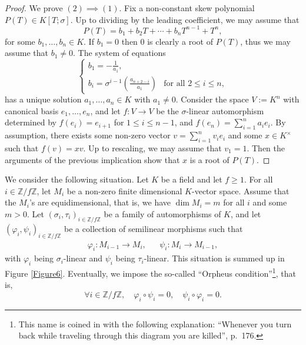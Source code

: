 \documentclass[12pt]{amsart}
\theoremstyle{definition}
\newcommand{\<}{\langle}   %
\renewcommand{\>}{\rangle} %
\begin{document}
\begin{proof}
    We prove $(2) \implies (1)$. Fix a non-constant skew polynomial $P(T) \in K[T;\sigma]$. Up to dividing by the leading coefficient, we may assume that
    \begin{equation*}
        P(T) = b_1 + b_2T + \cdots + b_{n}T^{n-1} + T^n,
    \end{equation*}
    for some $b_1,\ldots ,b_n \in K$. If $b_1 = 0$ then $0$ is clearly a root of $P(T)$, thus we may assume that $b_1 \not = 0$. The system of equations 
    \begin{equation*}
        \begin{cases}
            b_1 = -\frac{1}{a_1}, & \\
            b_i = \sigma^{i-1}\left(\frac{a_{n+2-i}}{a_1}\right) & \text{for all } 2 \leq i \leq n,
        \end{cases}
    \end{equation*}
    has a unique solution $a_1, \ldots , a_n \in K$ with $a_1 \not = 0$. Consider the space $V := K^n$ with canonical basis $e_1,\ldots ,e_n$, and let $f: V \to V$ be the $\sigma$-linear automorphism determined by $f(e_i) = e_{i+1}$ for $1 \leq i \leq n-1$, and $f(e_n) = \sum_{i=1}^n a_ie_i$. By assumption, there exists some non-zero vector $v = \sum_{i=1}^n v_ie_i$ and some $x \in K^{\times}$ such that $f(v) = xv$. Up to rescaling, we may assume that $v_1=1$. Then the arguments of the previous implication show that $x$ is a root of $P(T)$.
\end{proof}

We consider the following situation. Let $K$ be a field and let $f \geq 1$. For all $i \in \mathbb Z/f\mathbb Z$, let $M_i$ be a non-zero finite dimensional $K$-vector space. Assume that the $M_i$'s are equidimensional, that is, we have $\dim M_i = m$ for all $i$ and some $m > 0$. Let $(\sigma_i,\tau_i)_{i \in \mathbb Z/f\mathbb Z}$ be a family of automorphisms of $K$, and let $(\varphi_i,\psi_i)_{i \in \mathbb Z/f\mathbb Z}$ be a collection of semilinear morphisms such that 
\begin{align*}
    \varphi_i:M_{i-1} \to M_{i}, & & \psi_i:M_i \to M_{i-1},
\end{align*}
with $\varphi_i$ being $\sigma_i$-linear and $\psi_i$ being $\tau_i$-linear. This situation is summed up in Figure \ref{Figure6}. Eventually, we impose the so-called ``Orpheus condition''\footnote{This name is coined in \cite{kottwitzrapoport:2003} with the following explanation: ``Whenever you turn back while traveling through this diagram you are killed'', p.~176.}, that is, 
\begin{equation*}
    \forall i \in \mathbb Z/f\mathbb Z, \quad \varphi_i \circ \psi_i = 0, \quad \psi_i\circ\varphi_i = 0.
\end{equation*}
\end{document}

